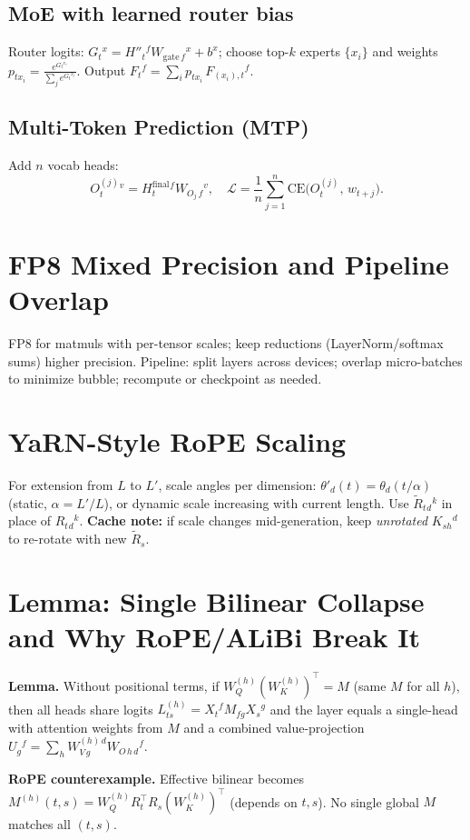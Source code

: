 \documentclass[11pt]{article}
\begin{document}
\subsection{MoE with learned router bias}
Router logits: $G_t{}^{x}=H''_t{}^{f} W_{\mathrm{gate}\,f}{}^{x}+b^{x}$; choose top-$k$ experts $\{x_i\}$ and weights $p_{t x_i}=\frac{e^{G_t{}^{x_i}}}{\sum_j e^{G_t{}^{x_j}}}$. Output $F_t{}^{f}=\sum_i p_{t x_i}\, F_{(x_i),t}{}^{f}$.

\subsection{Multi-Token Prediction (MTP)}
Add $n$ vocab heads:
\[
O^{(j)}_{t}{}^{v}=H^{\mathrm{final}}_{t}{}^{f} W_{O_j\,f}{}^{v},\quad
\mathcal{L}=\frac{1}{n}\sum_{j=1}^{n}\mathrm{CE}\big(O^{(j)}_{t},\, w_{t+j}\big).
\]

\section{FP8 Mixed Precision and Pipeline Overlap}
FP8 for matmuls with per-tensor scales; keep reductions (LayerNorm/softmax sums) higher precision. Pipeline: split layers across devices; overlap micro-batches to minimize bubble; recompute or checkpoint as needed.

\section{YaRN-Style RoPE Scaling}
For extension from $L$ to $L'$, scale angles per dimension: $\theta'_{d}(t)=\theta_{d}(t/\alpha)$ (static, $\alpha=L'/L$), or dynamic scale increasing with current length. Use $\tilde R_{t}{}_{d}{}^{k}$ in place of $R_{t}{}_{d}{}^{k}$. \textbf{Cache note:} if scale changes mid-generation, keep \emph{unrotated} $K_{s h}{}^{d}$ to re-rotate with new $\tilde R_{s}$.

\section{Lemma: Single Bilinear Collapse and Why RoPE/ALiBi Break It}
\textbf{Lemma.} Without positional terms, if $W_Q^{(h)} (W_K^{(h)})^{\top}=M$ (same $M$ for all $h$), then all heads share logits
$L_{t s}^{(h)}=X_t{}^{f} M_{f g} X_s{}^{g}$ and the layer equals a single-head with attention weights from $M$ and a combined value-projection $U_{g}{}^{f}=\sum_h W_{V\,g}^{(h)\,d} W_{O\,h\,d}{}^{f}$.

\textbf{RoPE counterexample.} Effective bilinear becomes $M^{(h)}(t,s)=W_Q^{(h)} R_{t}^{\top} R_{s} (W_K^{(h)})^{\top}$ (depends on $t,s$). No single global $M$ matches all $(t,s)$.
\end{document}
